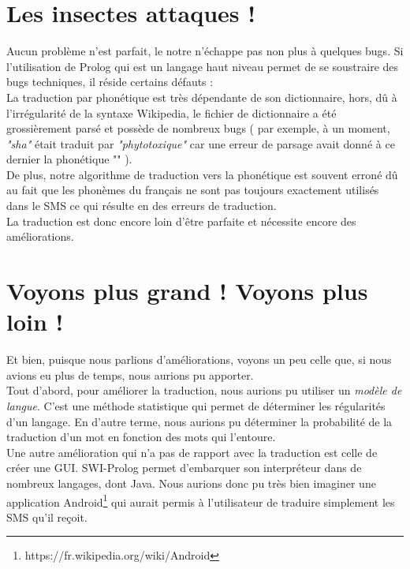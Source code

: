 \documentclass[11pt]{report}
\begin{document}
	\section{Les insectes attaques !}
	Aucun problème n'est parfait, le notre n’échappe pas non plus à quelques bugs. Si l'utilisation de Prolog qui est un langage haut niveau permet de se soustraire des bugs techniques, il réside certains défauts :\\
	La traduction par phonétique est très dépendante de son dictionnaire, hors, dû à l'irrégularité de la syntaxe Wikipedia, le fichier de dictionnaire a été grossièrement parsé et possède de nombreux bugs ( par exemple, à un moment, {\em "sha"} était traduit par {\em "phytotoxique"} car une erreur de parsage avait donné à ce dernier la phonétique "" ).\\
	De plus, notre algorithme de traduction vers la phonétique est souvent erroné dû au fait que les phonèmes du français ne sont pas toujours exactement utilisés dans le SMS ce qui résulte en des erreurs de traduction.\\
	La traduction est donc encore loin d'être parfaite et nécessite encore des améliorations. 
	
	\section{Voyons plus grand ! Voyons plus loin !}
	Et bien, puisque nous parlions d'améliorations, voyons un peu celle que, si nous avions eu plus de temps, nous aurions pu apporter.\\
	Tout d'abord, pour améliorer la traduction, nous aurions pu utiliser un {\em modèle de langue}. C'est une méthode statistique qui permet de déterminer les régularités d'un langage. En d'autre terme, nous aurions pu déterminer la probabilité de la traduction d'un mot en fonction des mots qui l'entoure.\\
	Une autre amélioration qui n'a pas de rapport avec la traduction est celle de créer une GUI. SWI-Prolog permet d'embarquer son interpréteur dans de nombreux langages, dont Java. Nous aurions donc pu très bien imaginer une application Android\footnote{https://fr.wikipedia.org/wiki/Android} qui aurait permis à l'utilisateur de traduire simplement les SMS qu'il reçoit.
	
\end{document}

